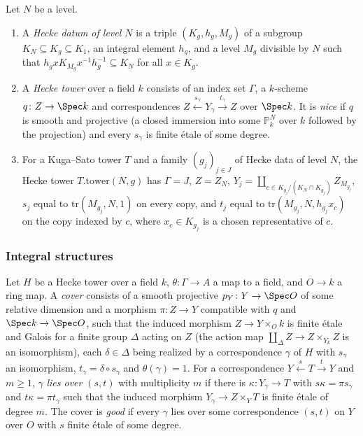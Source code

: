 \begin{definition}\label{pf:ks2:def:heckedata}
Let $N$ be a level.
\begin{enumerate}
\item A \emph{Hecke datum of level $N$} is a triple
  $(K_g,h_g,M_g)$ of a subgroup $K_N\subseteq K_g\subseteq K_1$, an integral element $h_g$, and a
  level $M_g$ divisible by $N$ such that $h_gxK_{M_g}x^{-1}h_g^{-1}\subseteq K_N$ for all
  $x\in K_g$.
\item A \emph{Hecke tower} over a field $k$ consists of an
  index set $\Gamma$, a $k$-scheme $q\colon Z\to\Spec k$ and correspondences
  $Z\xleftarrow{s_\gamma}Y_\gamma\xrightarrow{t_\gamma}Z$ over $\Spec k$. It is \emph{nice} if $q$ is smooth and projective (a closed immersion into
  some $\mathbb P^N_k$ over $k$ followed by the projection) and every $s_\gamma$ is finite \'etale
  of some degree.
\item For a Kuga--Sato tower $T$ and a family $(g_j)_{j\in J}$ of Hecke data of level $N$, the
  Hecke tower $T.\mathrm{tower}(N,g)$ has $\Gamma=J$,
  $Z=Z_N$, $Y_j=\coprod_{c\in K_{g_j}/(K_N\cap K_{g_j})}Z_{M_{g_j}}$, $s_j$ equal to
  $\mathrm{tr}(M_{g_j},N,1)$ on every copy, and $t_j$ equal to $\mathrm{tr}(M_{g_j},N,h_{g_j}x_c)$
  on the copy indexed by $c$, where $x_c\in K_{g_j}$ is a chosen representative of $c$.
\end{enumerate}
\end{definition}

\subsubsection{Integral structures}

\begin{definition}\label{pf:ks2:def:cover}
Let $H$ be a Hecke tower over a field $k$, $\theta\colon\Gamma\to A$ a map to a field, and $O\to
k$ a ring map. A \emph{cover} consists of a smooth
projective $p_Y\colon Y\to\Spec O$ of some relative dimension and a morphism $\pi\colon Z\to Y$
compatible with $q$ and $\Spec k\to\Spec O$, such that the induced morphism $Z\to Y\times_O k$ is
finite \'etale and Galois for a finite group $\Delta$ acting on $Z$ (the action map
$\coprod_{\Delta}Z\to Z\times_{Y_k}Z$ is an isomorphism), each $\delta\in\Delta$ being realized by
a correspondence $\gamma$ of $H$ with $s_\gamma$ an isomorphism, $t_\gamma=\delta\circ s_\gamma$
and $\theta(\gamma)=1$. For a correspondence $Y\xleftarrow{s}T\xrightarrow{t}Y$ and $m\ge1$,
$\gamma$ \emph{lies over} $(s,t)$ with multiplicity $m$
if there is $\kappa\colon Y_\gamma\to T$ with $s\kappa=\pi s_\gamma$ and $t\kappa=\pi t_\gamma$
such that the induced morphism $Y_\gamma\to Z\times_YT$ is finite \'etale of degree $m$. The cover
is \emph{good} if every $\gamma$ lies over some
correspondence $(s,t)$ on $Y$ over $O$ with $s$ finite \'etale of some degree.
\end{definition}

